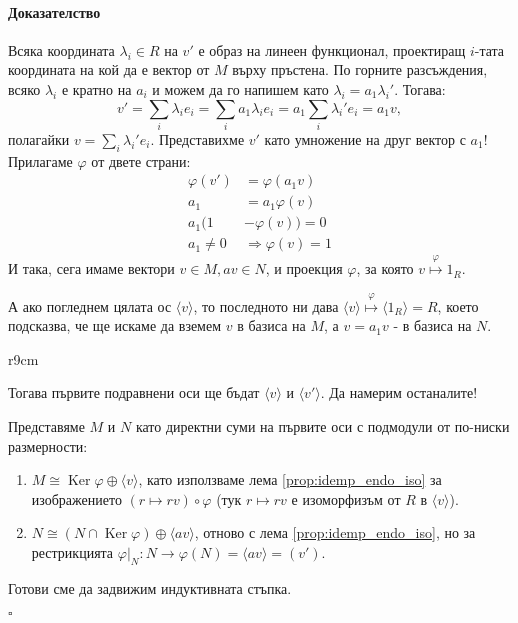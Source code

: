 \documentclass{article}
\newif\ifusemulticols
\newif\ifmobileview
\theoremstyle{definition}
\theoremstyle{remark}
\theoremstyle{plain}
\theoremstyle{plain}
\newenvironment{mymulticols}
    { \ifusemulticols \begin{multicols}{2} \fi }
    { \ifusemulticols \end{multicols} \fi }
\newcommand\mywrapbegin[3]{\ifmobileview\else\begin{wrapfigure}[#1]{#2}{#3}\fi}
\newcommand\mywrapend{\ifmobileview\else\end{wrapfigure}\fi}
\newenvironment{myproof}{\paragraph{Доказателство}}{\hfill$\square$}
\DeclareMathOperator{\Ker}{Ker}
\begin{document}
\begin{mymulticols}
\begin{myproof}
    Всяка координата $\lambda_i \in R$ на $v'$ е образ на линеен функционал, проектиращ $i$-тата
    координата на кой да е вектор от $M$ върху пръстена.
    По горните разсъждения, всяко $\lambda_i$ е кратно на $a_i$ и можем да го напишем като
    $\lambda_i = a_1 \lambda_i'$. Тогава: $$v' = \sum_i \lambda_i e_i = \sum_i a_1 \lambda_i e_i =
    a_1 \sum_i \lambda_i' e_i = a_1 v,$$
    полагайки $v = \sum_i \lambda_i'e_i$.
    Представихме $v'$ като умножение на друг вектор с $a_1$!
    Прилагаме $\varphi$ от двете страни:
    \begin{align*}
        \varphi(v') &= \varphi(a_1v)\\
        a_1 &= a_1 \varphi(v)\\
        a_1 ( 1 &- \varphi(v) ) = 0\\
        a_1 \neq 0 &\Rightarrow \varphi(v) = 1
    \end{align*}
    И така, сега имаме вектори $v \in M, av \in N$, и проекция $\varphi$, за която $v
    \stackrel{\varphi}\mapsto 1_R$.

    А ако погледнем цялата ос $\langle v \rangle$, то последното ни дава $\langle v \rangle
    \stackrel{\varphi}\mapsto \langle 1_R \rangle = R$, което  подсказва, че ще искаме да вземем
    $v$ в базиса на $M$, а $v=a_1v$ - в базиса на $N$.

    \mywrapbegin{21}{r}{9cm}
    \mywrapend

    Тогава първите подравнени оси ще бъдат $\langle v \rangle$ и $\langle v' \rangle$. Да намерим
    останалите!

    Представяме $M$ и $N$ като директни суми на първите оси с подмодули от по-ниски размерности:

    \begin{enumerate}
        \item $M \cong \Ker \varphi \oplus \langle v \rangle$, като използваме %
            лема \ref{prop:idemp_endo_iso} за изображението $(r \mapsto rv) \circ \varphi$ (тук
            $r\mapsto rv$ е изоморфизъм от $R$ в $\langle v \rangle$).

        \item $N \cong (N \cap \Ker \varphi) \oplus \langle av \rangle$, отново с лема
            \ref{prop:idemp_endo_iso}, но за рестрикцията $\varphi|_N: N \to \varphi(N) = \langle av
            \rangle = \left(v'\right)$.
    \end{enumerate}

    Готови сме да задвижим индуктивната стъпка.


\end{myproof}
\end{mymulticols}
\end{document}
